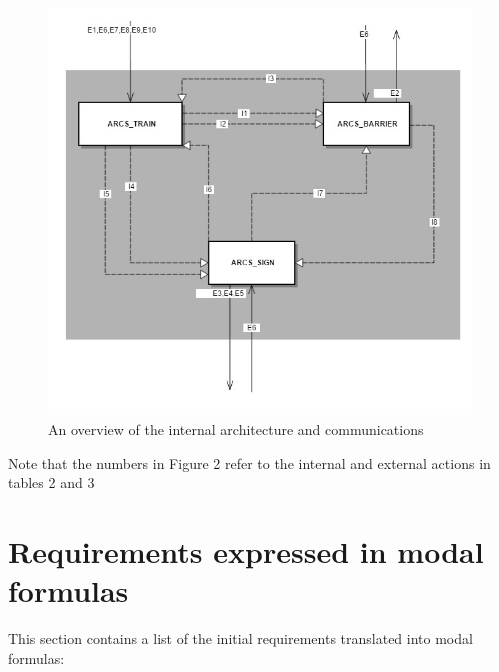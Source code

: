 \documentclass[10pt,a4paper]{article}
\begin{document}
\begin{figure}[thpb]
	\centering
	\includegraphics[scale=0.35]{Internal_Diag.JPG}
	\caption{An overview of the internal architecture and communications}
\end{figure} 

Note that the numbers in Figure 2 refer to the internal and external actions in tables 2 and 3

\newpage

\section{Requirements expressed in modal formulas}


This section contains a list of the initial requirements translated into modal formulas:
\end{document}
